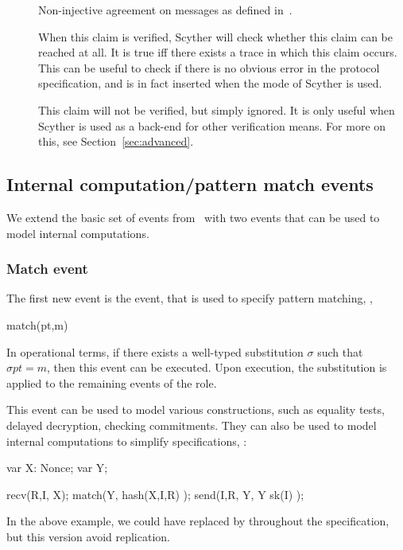 \documentclass{book}
\begin{document}
\begin{description}
  \item[]

  	Non-injective agreement on messages as defined in~\cite{opsembook}.

  \item[]

	When this claim is verified, Scyther will check whether this
	claim can be reached at all. It is true iff there exists a trace
	in which this claim occurs. This can be useful to check if there
	is no obvious error in the protocol specification, and is in
	fact inserted when the  mode of Scyther is used.

  \item[]
  	This claim will not be verified, but simply ignored. It is only
	useful when Scyther is used as a back-end for other verification
	means. For more on this, see Section~\ref{sec:advanced}.

\end{description}


\subsection{Internal computation/pattern match events}

We extend the basic set of events from~\cite{opsembook} with two events that can be used to
model internal computations.

\subsubsection[Match event]{Match event}

The first new event is the  event, that is used to specify
pattern matching, \ie,
\begin{spdl}
  match(pt,m)
\end{spdl}
In operational terms, if there exists a well-typed substitution $\sigma$
such that $\sigma pt = m$, then this event can be executed. Upon
execution, the substitution is applied to the remaining events of the
role.

This event can be used to model various constructions, such as equality
tests, delayed decryption, checking commitments. They can also be used
to model internal computations to simplify specifications, \eg:
\begin{spdl}
  var X: Nonce;
  var Y;

  recv(R,I, X);
  match(Y, hash(X,I,R) );
  send(I,R, Y,{ Y }sk(I) );
\end{spdl}
In the above example, we could have replaced  by
 throughout the specification, but this version avoid
replication.
\end{document}
